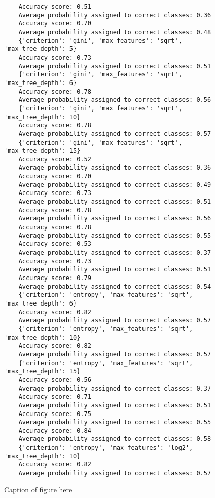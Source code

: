 \begin{figure}[H]
\begin{verbatim}
    Accuracy score: 0.51
    Average probability assigned to correct classes: 0.36
    Accuracy score: 0.70
    Average probability assigned to correct classes: 0.48
    {'criterion': 'gini', 'max_features': 'sqrt', 'max_tree_depth': 5}
    Accuracy score: 0.73
    Average probability assigned to correct classes: 0.51
    {'criterion': 'gini', 'max_features': 'sqrt', 'max_tree_depth': 6}
    Accuracy score: 0.78
    Average probability assigned to correct classes: 0.56
    {'criterion': 'gini', 'max_features': 'sqrt', 'max_tree_depth': 10}
    Accuracy score: 0.78
    Average probability assigned to correct classes: 0.57
    {'criterion': 'gini', 'max_features': 'sqrt', 'max_tree_depth': 15}
    Accuracy score: 0.52
    Average probability assigned to correct classes: 0.36
    Accuracy score: 0.70
    Average probability assigned to correct classes: 0.49
    Accuracy score: 0.73
    Average probability assigned to correct classes: 0.51
    Accuracy score: 0.78
    Average probability assigned to correct classes: 0.56
    Accuracy score: 0.78
    Average probability assigned to correct classes: 0.55
    Accuracy score: 0.53
    Average probability assigned to correct classes: 0.37
    Accuracy score: 0.73
    Average probability assigned to correct classes: 0.51
    Accuracy score: 0.79
    Average probability assigned to correct classes: 0.54
    {'criterion': 'entropy', 'max_features': 'sqrt', 'max_tree_depth': 6}
    Accuracy score: 0.82
    Average probability assigned to correct classes: 0.57
    {'criterion': 'entropy', 'max_features': 'sqrt', 'max_tree_depth': 10}
    Accuracy score: 0.82
    Average probability assigned to correct classes: 0.57
    {'criterion': 'entropy', 'max_features': 'sqrt', 'max_tree_depth': 15}
    Accuracy score: 0.56
    Average probability assigned to correct classes: 0.37
    Accuracy score: 0.71
    Average probability assigned to correct classes: 0.51
    Accuracy score: 0.75
    Average probability assigned to correct classes: 0.55
    Accuracy score: 0.84
    Average probability assigned to correct classes: 0.58
    {'criterion': 'entropy', 'max_features': 'log2', 'max_tree_depth': 10}
    Accuracy score: 0.82
    Average probability assigned to correct classes: 0.57
\end{verbatim}
\caption{Caption of figure here}
\end{figure}

\newpage